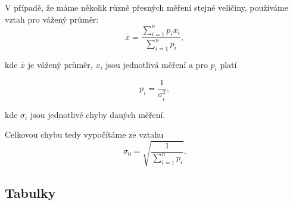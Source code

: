 \documentclass[english]{article}
\begin{document}
V případě, že máme několik různě přesných měření stejné veličiny, používáme vztah pro vážený průměr:
	\begin{equation} 
	\bar{x}=\frac{\sum\limits_{i=1}^{n}p_{i}x_{i}}{\sum\limits_{i=1}^{n}p_{i}},
	\end{equation}
	
	kde $\bar{x}$ je vážený průměr, $x_{i}$ jsou jednotlivá měření a pro $p_{i}$ platí
	 
	\begin{equation}
	p_{i}=\frac{1}{\sigma_{i}^{2}},
	\end{equation}
	
	kde $\sigma_{i}$ jsou jednotlivé chyby daných měření.
	 
	Celkovou chybu tedy vypočítáme ze vztahu
	\begin{equation} \label{eq:vazeny_prumer}
	\sigma_{0}=\sqrt{\frac{1}{\sum\limits_{i=1}^{n}p_{i}}}.
	\end{equation}
	
	
\clearpage
\subsection{Tabulky}
\end{document}
